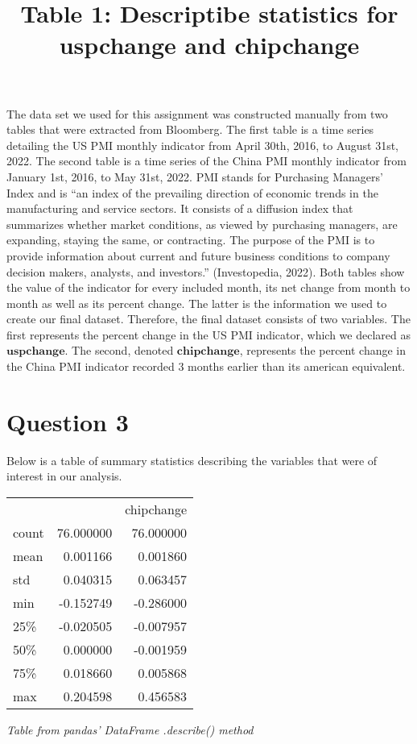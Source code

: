 \documentclass{article}
\begin{document}
The data set we used for this assignment was constructed manually from two tables that were extracted from Bloomberg. The first table is a time series detailing the US PMI monthly indicator from April 30th, 2016, to August 31st, 2022. The second table is a time series of the China PMI monthly indicator from January 1st, 2016, to May 31st, 2022. PMI stands for Purchasing Managers’ Index and is “an index of the prevailing direction of economic trends in the manufacturing and service sectors. It consists of a diffusion index that summarizes whether market conditions, as viewed by purchasing managers, are expanding, staying the same, or contracting. The purpose of the PMI is to provide information about current and future business conditions to company decision makers, analysts, and investors.” (Investopedia, 2022). Both tables show the value of the indicator for every included month, its net change from month to month as well as its percent change. The latter is the information we used to create our final dataset. Therefore, the final dataset consists of two variables. The first represents the percent change in the US PMI indicator, which we declared as $\textbf{uspchange}$. The second, denoted $\textbf{chipchange}$, represents the percent change in the China PMI indicator recorded 3 months earlier than its american equivalent.

\section{Question 3}

Below is a table of summary statistics describing the variables that were of interest in our analysis.
\begin{center}

\title{Table 1: Descriptibe statistics for uspchange and chipchange}

\begin{tabular}{lrr}
{} &  \textbf{} &  chipchange \\
count &  76.000000 &   76.000000 \\
mean  &   0.001166 &    0.001860 \\
std   &   0.040315 &    0.063457 \\
min   &  -0.152749 &   -0.286000 \\
25\%   &  -0.020505 &   -0.007957 \\
50\%   &   0.000000 &   -0.001959 \\
75\%   &   0.018660 &    0.005868 \\
max   &   0.204598 &    0.456583 \\
\end{tabular}

\textit{Table from pandas' DataFrame .describe() method}

\end{center}
\end{document}
